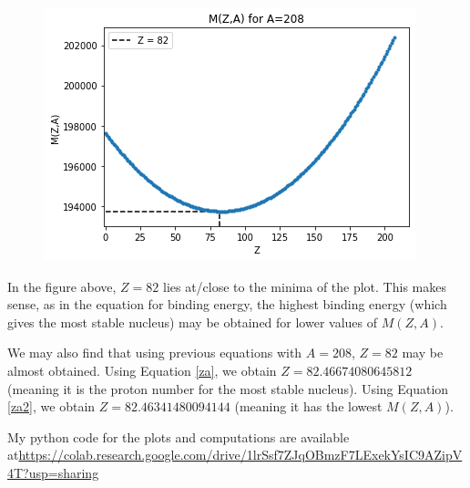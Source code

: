 \documentclass[11pt]{article}
\theoremstyle{definition}
\begin{document}
\begin{figure}[H]
    \centering
    \includegraphics[scale = 0.75]{M(Z,A) with label.png}
\end{figure}

In the figure above, $Z=82$ lies at/close to the minima of the plot. This makes sense, as in the equation for binding energy, the highest binding energy (which gives the most stable nucleus) may be obtained for lower values of $M(Z,A)$.

We may also find that using previous equations with $A=208$, $Z=82$ may be almost obtained. Using Equation \ref{za}, we obtain $Z=82.46674080645812$ (meaning it is the proton number for the most stable nucleus). Using Equation \ref{za2}, we obtain $Z=82.46341480094144$ (meaning it has the lowest $M(Z,A)$).

My python code for the plots and computations are available at\newline \underline{https://colab.research.google.com/drive/1lrSsf7ZJqOBmzF7LExekYsIC9AZipV4T?usp=sharing}
\newpage



\newpage
\end{document}
